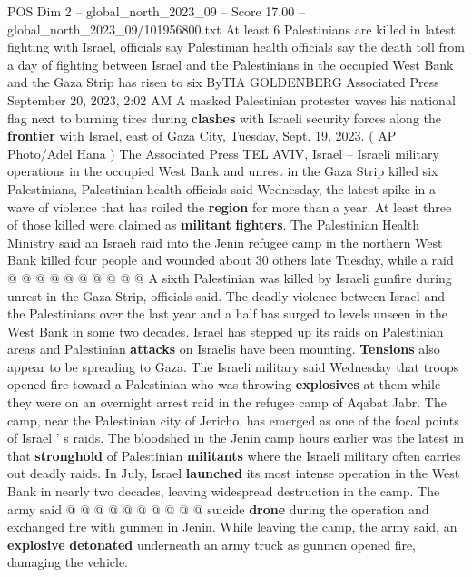 \begin{textsample}{POS Dim 2 – global\_north\_2023\_09 – Score 17.00 – global\_north\_2023\_09/101956800.txt}  \label{ex:f2_pos_132}
At least 6 Palestinians are killed in latest fighting with Israel, officials say Palestinian health officials say the death toll from a day of fighting between Israel and the Palestinians in the occupied West Bank and the Gaza Strip has risen to six ByTIA GOLDENBERG Associated Press September 20, 2023, 2:02 AM A masked Palestinian protester waves his national flag next to burning tires during \textbf{clashes} with Israeli security forces along the \textbf{frontier} with Israel, east of Gaza City, Tuesday, Sept. 19, 2023. ( AP Photo/Adel Hana ) The Associated Press TEL AVIV, Israel -- Israeli military operations in the occupied West Bank and unrest in the Gaza Strip killed six Palestinians, Palestinian health officials said Wednesday, the latest spike in a wave of violence that has roiled the \textbf{region} for more than a year.
At least three of those killed were claimed as \textbf{militant} \textbf{fighters}.
The Palestinian Health Ministry said an Israeli raid into the Jenin refugee camp in the northern West Bank killed four people and wounded about 30 others late Tuesday, while a raid @ @ @ @ @ @ @ @ @ @ A sixth Palestinian was killed by Israeli gunfire during unrest in the Gaza Strip, officials said.
The deadly violence between Israel and the Palestinians over the last year and a half has surged to levels unseen in the West Bank in some two decades.
Israel has stepped up its raids on Palestinian areas and Palestinian \textbf{attacks} on Israelis have been mounting. \textbf{Tensions} also appear to be spreading to Gaza.
The Israeli military said Wednesday that troops opened fire toward a Palestinian who was throwing \textbf{explosives} at them while they were on an overnight arrest raid in the refugee camp of Aqabat Jabr.
The camp, near the Palestinian city of Jericho, has emerged as one of the focal points of Israel ' s raids.
The bloodshed in the Jenin camp hours earlier was the latest in that \textbf{stronghold} of Palestinian \textbf{militants} where the Israeli military often carries out deadly raids.
In July, Israel \textbf{launched} its most intense operation in the West Bank in nearly two decades, leaving widespread destruction in the camp.
The army said @ @ @ @ @ @ @ @ @ @ suicide \textbf{drone} during the operation and exchanged fire with gunmen in Jenin.
While leaving the camp, the army said, an \textbf{explosive} \textbf{detonated} underneath an army truck as gunmen opened fire, damaging the vehicle.

\end{textsample}
